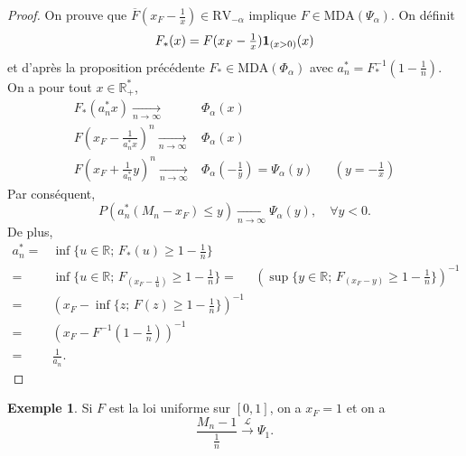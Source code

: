 \documentclass[10p,a4paper,reqno,titlepage]{report}
\newcommand{\R}{\mathbb{R}}
\newcommand{\indic}{\mathrm{{\bf 1}}}
\theoremstyle{plain}
\theoremstyle{definition}
\newtheorem{ex}[ex]{Exemple}
\newcommand{\cvloi}{\stackrel{\mathcal{L}}{\longrightarrow}}
\begin{document}
\begin{proof}
	On prouve que $\overline{F} (x_F - \tfrac1x) \in \mathrm{RV}_{-\alpha}$ implique $F \in \mathrm{MDA}(\Psi_\alpha)$. On définit
	$$ F_\ast (x)= F(x_F - \tfrac1x) \indic_{(x>0)}(x)$$
	et d'après la proposition précédente $F_\ast \in \mathrm{MDA}(\Phi_\alpha)$ avec $a^* _n = F_\ast ^{-1} (1-\tfrac1n)$.\\
	On a pour tout $x\in\R_+ ^*$,
	\begin{align*}
		F_* (a_n ^* x ) \underset{n\to\infty}{\longrightarrow}&  \Phi_\alpha(x)\\
		F(x_F - \frac{1}{a_n ^* x }) ^n  \underset{n\to\infty}{\longrightarrow}&  \Phi_\alpha(x)\\
		F(x_F + \frac{1}{a_n ^* }y) ^n  \underset{n\to\infty}{\longrightarrow}&  \Phi_\alpha(-\frac1y )=\Psi_{\alpha}(y) && (y=-\frac{1}{x})
	\end{align*}
Par conséquent,
 $$ P(a_n^* (M_n - x_F) \leq y ) \underset{n\to\infty}{\longrightarrow} \Psi_{\alpha} (y),\quad\forall y < 0.$$
 De plus,
 \begin{align*}
 	a_n ^* = &  \inf \{u \in\R; \, F_* (u) \geq 1 -\tfrac1n \}\\
 	=&   \inf \{u \in\R; \, F_ (x_F -\tfrac1u ) \geq 1 -\tfrac1n \}
 	= & ( \sup \{y \in\R; \, F_ (x_F -y  ) \geq 1 -\tfrac1n \})^{-1} \\
 	=&  (x_F - \inf\{z; \, F(z) \geq 1 -\tfrac1n \})^{-1}\\
 	= & (x_F - F^{-1}(1-\tfrac1n ))^{-1}\\
 	= & \frac{1}{a_n}.
 \end{align*}
\end{proof}
\begin{ex}
	Si $F$ est la loi uniforme sur $[0,1]$, on a $x_F = 1 $ et on a
	$$ \frac{M_n - 1}{\tfrac1n }\cvloi \Psi_{1}.$$
\end{ex}
\end{document}
